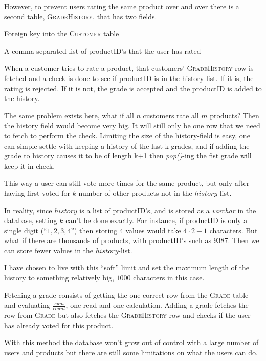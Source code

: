 \documentclass[12pt, a4paper,titlepage]{article}
\begin{document}
However, to prevent users rating the same product over and over there is a
second table, \textsc{GradeHistory}, that has two fields.
\begin{description}
\setlength\itemsep{-7pt}
\item[customer] Foreign key into the \textsc{Customer} table
\item[history] A comma-separated list of productID's that the user has rated
\end{description}
When a customer tries to rate a product, that customers' 
\textsc{GradeHistory}-row is fetched and a check is done to see if productID is
in the history-list. If it is, the rating is rejected. If it is not, the grade is
accepted and the productID is added to the history.

The same problem exists here, what if all $n$ customers rate all $m$ products?
Then the history field would become very big. It will still only be one row that
we need to fetch to perform the check.
Limiting the size of the history-field is easy, one can simple settle with keeping
a history of the last k grades, and if adding the grade to history causes it to be
of length k+1 then \emph{pop()}-ing the fist grade will keep it in check. 

This way a user can still vote more times for the same product, but
only after having first voted for $k$ number of other products not in the
 $history$-list. 

In reality, since $history$ is a list of productID's, and is stored as a 
\emph{varchar} in the database, setting $k$ can't be done exactly.
For instance, if productID is only a single digit (``$1,2,3,4$'') then storing 
$4$ values would take $4\cdot 2 - 1$ characters. But what if there are
thousands of products, with productID's such as $9387$. Then we can store
fewer values in the $history$-list.

I have chosen to live with this ``soft'' limit and set the maximum length of
the history to something relatively big, $1000$ characters in this case.

Fetching a grade consists of getting the  one correct row from the 
\textsc{Grade}-table and evaluating $\frac{sum}{count}$, one read and one
calculation.
Adding a grade fetches the row from \textsc{Grade} but also fetches the \textsc{GradeHistory}-row and checks if the user has already
voted for this product.

With this method the database won't grow out of control with a large number 
of users and products but there are still some limitations on what the users 
can do.
\end{document}
